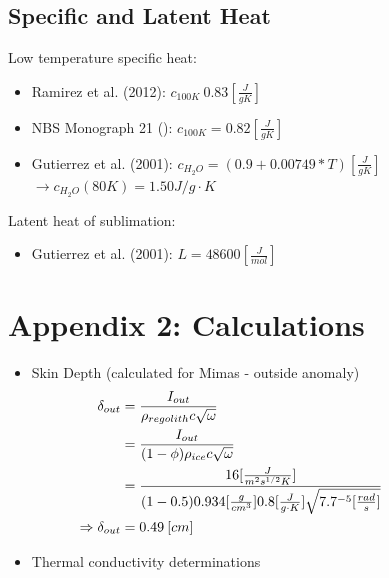 \documentclass[11pt]{article} %
\begin{document}
\begin{figure}[ht]
\begin{Table}
\begin{Comment}
\subsection{Specific  and Latent Heat}
\label{sec:sheat}

	Low temperature specific heat:
	
	\begin{itemize}
	\item Ramirez et al. (2012): $c_{100 K} ~ 0.83 [\frac{J}{g K}]$
	\item NBS Monograph 21 (): $c_{100 K} = 0.82 [\frac{J}{g K}]$
	\item Gutierrez et al. (2001): $c_{H_{2}O} = (0.9 + 0.00749 * T) [\frac{J}{g K}]$
		$\rightarrow c_{H_{2}O}(80K) = 1.50 J/g\cdot K$
	\end{itemize}
	
	Latent heat of sublimation:
	
	\begin{itemize}
	\item Gutierrez et al. (2001): $L = 48600 [\frac{J}{mol}]$
	\end{itemize}

\section{Appendix 2: Calculations}

\begin{itemize} 
\item Skin Depth (calculated for Mimas - outside anomaly)
	\begin{equation}
	\begin{split}
	\delta_{out} &= \frac{I_{out}}{\rho_{regolith} c \sqrt{\omega}}  \\
	&= \frac{I_{out}}{(1-\phi)\rho_ {ice} c \sqrt{\omega}} \\
	&= \frac{16[\frac{J}{m^{2} s^{1/2} K}]}{(1-0.5)0.934[\frac{g}{cm^{3}}]0.8[\frac{J}{g \cdot K}]\sqrt{7.7\time10^{-5}[\frac{rad}{s}]}} \\
	\Rightarrow \delta_{out}&= 0.49\: [cm]
	\end{split}
	\end{equation}
	
\item Thermal conductivity determinations
	

\end{itemize}
\end{Comment}
\end{Table}
\end{figure}
\end{document}
